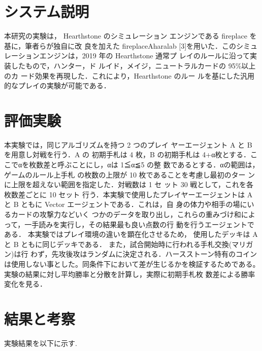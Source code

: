 \documentclass[twocolumn]{ltjsarticle}
\begin{document}
\section{システム説明}
\small{
  本研究の実験は， Hearthstone のシミュレーション
エンジンである fireplace を基に，筆者らが独自に改
良を加えた fireplaceAharalab [3]を用いた．このシミュ
レーションエンジンは，2019 年の Hearthstone 通常プ
レイのルールに沿って実装したもので，ハンター，ド
ルイド，メイジ，ニュートラルカードの 95\%以上のカ
ード効果を再現した．これにより，Hearthstone のルー
ルを基にした汎用的なプレイの実験が可能である．
}
\section{評価実験}
\small{
  本実験では，同じアルゴリズムを持つ 2 つのプレイ
ヤーエージェント A と B を用意し対戦を行う．A の
初期手札は 4 枚，B の初期手札は 4+α枚とする．こ
こでαを枚数差と呼ぶことにし，αは 1≦α≦5 の整
数であるとする．αの範囲は，ゲームのルール上手札
の枚数の上限が 10 枚であることを考慮し最初のター
ンに上限を超えない範囲を指定した．対戦数は 1 セ
ット 30 戦として，これを各枚数差ごとに 10 セット
行う．本実験で使用したプレイヤーエージェントは A
と B ともに Vector エージェントである．これは，自
身の体力や相手の場にいるカードの攻撃力などいく
つかのデータを取り出し，これらの重みづけ和によ
って，一手読みを実行し，その結果最も良い点数の行
動を行うエージェントである．
本実験ではプレイ環境の違いを顕在化させるため，
使用したデッキは A と B ともに同じデッキである．
また，試合開始時に行われる手札交換(マリガン)は行
わず，先攻後攻はランダムに決定される．ハースストーン特有のコインは使用しない事とした。同条件下において差が生じるかを検証するためである。
実験の結果に対し平均勝率と分散を計算し，実際に初期手札枚
数差による勝率変化を見る．
}
\section{結果と考察}
\small{
  実験結果を以下に示す.
}
\end{document}
